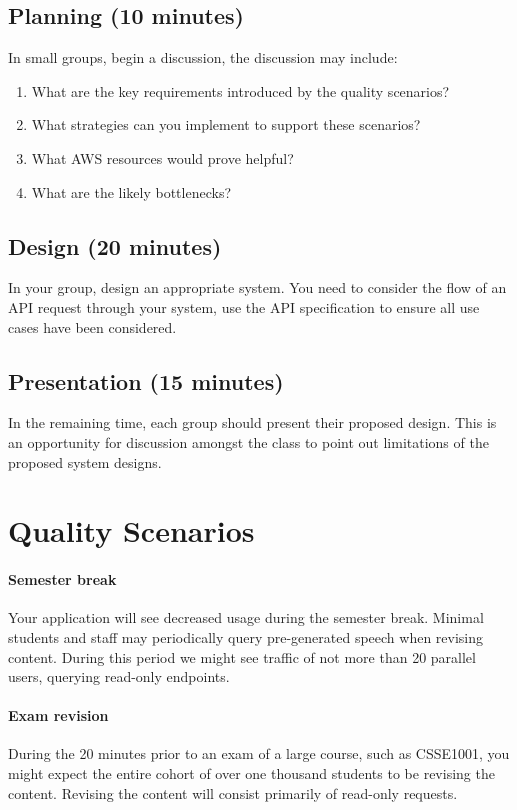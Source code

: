 \documentclass{csse4400}
\begin{document}
\subsection*{Planning (10 minutes)}
In small groups, begin a discussion,
the discussion may include:

\begin{enumerate}
    \item What are the key requirements introduced by the quality scenarios?
    \item What strategies can you implement to support these scenarios?
    \item What AWS resources would prove helpful?
    \item What are the likely bottlenecks?
\end{enumerate}

\subsection*{Design (20 minutes)}

In your group, design an appropriate system.
You need to consider the flow of an API request through your system,
use the API specification to ensure all use cases have been considered.

\subsection*{Presentation (15 minutes)}

In the remaining time,
each group should present their proposed design.
This is an opportunity for discussion amongst the class to point out limitations of the proposed system designs.


\section{Quality Scenarios}\label{sec:scenarios}

\paragraph{Semester break}
Your application will see decreased usage during the semester break.
Minimal students and staff may periodically query pre-generated speech when revising content.
During this period we might see traffic of not more than 20 parallel users,
querying read-only endpoints.

\paragraph{Exam revision}
During the 20 minutes prior to an exam of a large course, such as CSSE1001,
you might expect the entire cohort of over one thousand students to be revising the content.
Revising the content will consist primarily of read-only requests.
\end{document}
